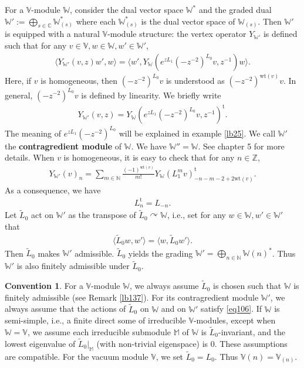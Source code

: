 \documentclass[12pt,b5paper,notitlepage]{report}
\theoremstyle{definition}
\newtheorem{cv}[df]{Convention}
\theoremstyle{plain}
\newcommand{\wtd}{\widetilde}
\newcommand{\tr}{\mathrm{t}} %
\newcommand{\bk}[1]{\langle {#1}\rangle}
\newcommand{\mbb}{\mathbb}
\newcommand{\Vbb}{\mathbb V}
\newcommand{\Wbb}{\mathbb W}
\newcommand{\Mbb}{\mathbb M}
\newcommand{\Nbb}{\mathbb N}
\newcommand{\wt}{\mathrm{wt}}
\numberwithin{equation}{section}
\begin{document}
For a $\Vbb$-module $\Wbb$, consider the dual vector space $\Wbb^*$ and the graded dual $\Wbb':=\bigoplus_{s\in\mbb C}\Wbb_{(s)}^*$ where each $\Wbb_{(s)}^*$ is the dual vector space of $\Wbb_{(s)}$. \index{W@$\Wbb',\Wbb^*$} Then $\Wbb'$ is equipped with a natural $\Vbb$-module structure: the vertex operator $Y_{\Wbb'}$ is defined such that for any $v\in\Vbb,w\in\Wbb,w'\in\Wbb'$,
\begin{align}
\bk{Y_{\Wbb'}(v,z)w',w}=\bk{w',Y_{\Wbb}(e^{zL_1}(-z^{-2})^{L_0} v,z^{-1})w}.\label{eq41}
\end{align}
Here, if $v$ is homogeneous, then $(-z^{-2})^{L_0}v$ is understood as $(-z^{-2})^{\wt(v)}v$. In general, $(-z^{-2})^{L_0}v$ is defined by linearity. We briefly write
\begin{align}
Y_{\Wbb'}(v,z)=Y_{\Wbb}(e^{zL_1}(-z^{-2})^{L_0} v,z^{-1})^\tr.\label{eq72}
\end{align}
The meaning of $e^{zL_1}(-z^{-2})^{L_0}$ will be explained in example \ref{lb25}. We call $\Wbb'$ the \textbf{contragredient module} of $\Wbb$. We have $\Wbb''=\Wbb$. See \cite{FHL93} chapter 5 for more details. When $v$ is homogeneous, it is easy to check that for any $n\in\mbb Z$,
\begin{align}
Y_{\Wbb'}(v)_n=\sum_{m\in\mathbb N}\frac{(-1)^{\wt(v)}}{m!}Y_\Wbb(L_1^mv)_{-n-m-2+2\wt(v)}^\tr.\label{eq211}
\end{align}
As a consequence, we have
\begin{align}
L_n^\tr=L_{-n}.
\end{align}
Let $\wtd L_0$ act on $\Wbb'$ as the transpose of $\wtd L_0\curvearrowright\Wbb$, i.e., set for any $w\in\Wbb,w'\in\Wbb'$ that
\begin{align}
\bk{\wtd L_0 w,w'}=\bk{w,\wtd L_0 w'}.\label{eq106}
\end{align}
Then $\wtd L_0$ makes $\Wbb'$ admissible. $\wtd L_0$ yields the grading $\Wbb'=\bigoplus_{n\in\Nbb}\Wbb(n)^*$. Thus $\Wbb'$ is also finitely admissible under $\wtd L_0$.


\begin{cv}\label{lb36}
For a $\Vbb$-module $\Wbb$, we always assume $\wtd L_0$ is chosen such that $\Wbb$ is finitely admissible (see Remark \ref{lb137}). For its contragredient module $\Wbb'$, we always assume that the actions of $\wtd L_0$ on $\Wbb$ and on $\Wbb'$ satisfy \eqref{eq106}.  If $\Wbb$ is semi-simple, i.e., a finite direct some of irreducible $\Vbb$-modules, except when $\Wbb=\Vbb$, we assume  each irreducible submodule $\Mbb$ of $\Wbb$  is $\wtd L_0$-invariant, and the lowest eigenvalue of $\wtd L_0|_{\Mbb}$ (with non-trivial eigenspace) is $0$. These  assumptions are compatible. For the vacuum module $\Vbb$, we set $\wtd L_0=L_0$. Thus $\Vbb(n)=\Vbb_{(n)}$.
\end{cv}
\end{document}
